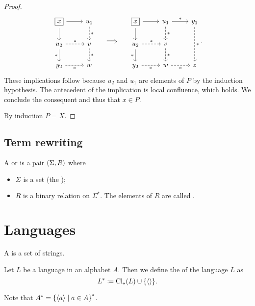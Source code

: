 \begin{proof}
\[\begin{tikzcd}
\boxed{x} \rar \dar & u_1 \arrow[d, dashed, "{*}"] \\
u_2 \arrow[d, swap, "{*}"] \arrow[r, dashed, "{*}"] & v \arrow[d, dashed, "{*}"] \\
y_2 \arrow[r, swap, dashed, "{*}"] & w
\end{tikzcd} \quad\implies\quad \begin{tikzcd}
\boxed{x} \rar \dar & u_1 \arrow[r, "{*}"] \arrow[d, dashed, "{*}"] & y_1 \arrow[dd, dashed, "{*}"] \\
u_2 \arrow[d, swap, "{*}"] \arrow[r, dashed, "{*}"] & v \arrow[d, dashed, "{*}"] & {} \\
y_2 \arrow[r, swap, dashed, "{*}"] & w \arrow[r, swap, dashed, "{*}"] & z
\end{tikzcd}. \]
These implications follow because $u_2$ and $u_1$ are elements of $P$ by the induction hypothesis. The antecedent of the implication is local confluence, which holds. We conclude the consequent and thus that $x\in P$.

By induction $P=X$.
\end{proof}

\section{Term rewriting}
\begin{definition}
A  or  is a pair $\left( \Sigma, R \right)$ where
\begin{itemize}
\item $\Sigma$ is a set (the );
\item $R$ is a binary relation on $\Sigma^*$. The elements of $R$ are called .
\end{itemize}
\end{definition}

\chapter{Languages}
\begin{definition}
A  is a set of strings.
\end{definition}

\begin{definition}
Let $L$ be a language in an alphabet $A$. Then we define the  of the language $L$ as
\[ L^* \coloneqq \operatorname{Cl}_\star(L) \cup \{\left\langle  \right\rangle\}. \]
\end{definition}
Note that $A^* = \left\{ \left\langle a \right\rangle \;\middle|\; a\in A \right\}^*$.


